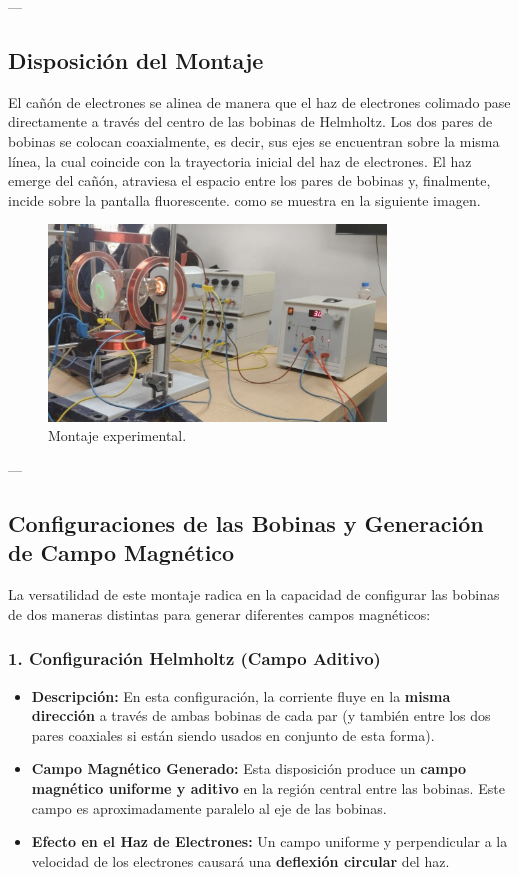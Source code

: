 ---

\subsection{Disposición del Montaje}
El cañón de electrones se alinea de manera que el haz de electrones colimado pase directamente a través del centro de las bobinas de Helmholtz. Los dos pares de bobinas se colocan coaxialmente, es decir, sus ejes se encuentran sobre la misma línea, la cual coincide con la trayectoria inicial del haz de electrones. El haz emerge del cañón, atraviesa el espacio entre los pares de bobinas y, finalmente, incide sobre la pantalla fluorescente. como se muestra en la siguiente imagen.

\begin{figure}[htbp]
    \centering
    \includegraphics[width=0.8\textwidth]{Sections/Figures/Montaje.jpeg}
    \caption{Montaje experimental.}
    \label{fig:nombre_descriptivo_de_la_imagen}
\end{figure}

---

\subsection{Configuraciones de las Bobinas y Generación de Campo Magnético}
La versatilidad de este montaje radica en la capacidad de configurar las bobinas de dos maneras distintas para generar diferentes campos magnéticos:

\subsubsection{1. Configuración Helmholtz (Campo Aditivo)}
\begin{itemize}
    \item \textbf{Descripción:} En esta configuración, la corriente fluye en la \textbf{misma dirección} a través de ambas bobinas de cada par (y también entre los dos pares coaxiales si están siendo usados en conjunto de esta forma).
    \item \textbf{Campo Magnético Generado:} Esta disposición produce un \textbf{campo magnético uniforme y aditivo} en la región central entre las bobinas. Este campo es aproximadamente paralelo al eje de las bobinas.
    \item \textbf{Efecto en el Haz de Electrones:} Un campo uniforme y perpendicular a la velocidad de los electrones causará una \textbf{deflexión circular} del haz.
\end{itemize}

